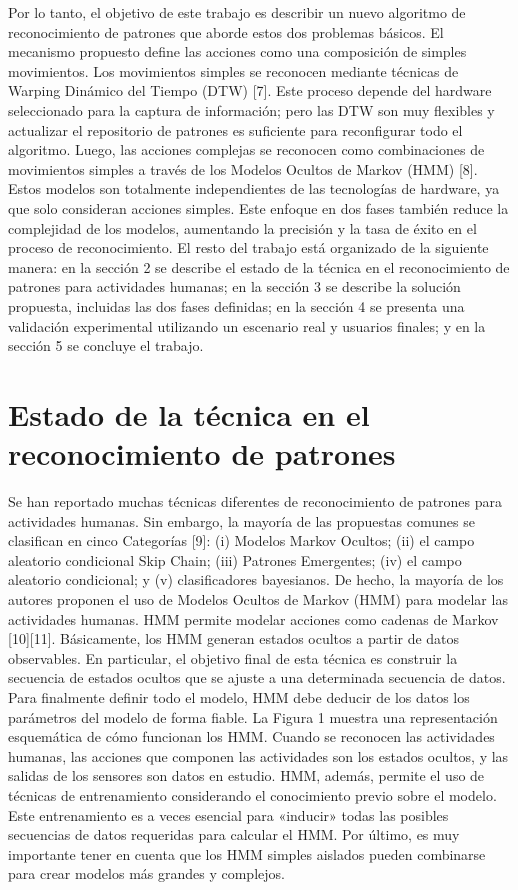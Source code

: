 \documentclass[a4paper]{article}
\begin{document}
Por lo tanto, el objetivo de este trabajo es describir un nuevo algoritmo de reconocimiento de patrones que aborde estos dos problemas básicos. El mecanismo propuesto define las acciones como una composición de simples movimientos. Los movimientos simples se reconocen mediante técnicas de Warping Dinámico del Tiempo (DTW) [7]. Este proceso depende del hardware seleccionado para la captura de información; pero las DTW son muy flexibles y actualizar el repositorio de patrones es suficiente para reconfigurar todo el algoritmo. Luego, las acciones complejas se reconocen como combinaciones de movimientos simples a través de los Modelos Ocultos de Markov (HMM) [8]. Estos modelos son totalmente independientes de las tecnologías de hardware, ya que solo consideran acciones simples. Este enfoque en dos fases también reduce la complejidad de los modelos, aumentando la precisión y la tasa de éxito en el proceso de reconocimiento.
El resto del trabajo está organizado de la siguiente manera: en la sección 2 se describe el estado de la técnica en el reconocimiento de patrones para actividades humanas; en la sección 3 se describe la solución propuesta, incluidas las dos fases definidas; en la sección 4 se presenta una validación experimental utilizando un escenario real y usuarios finales; y en la sección 5 se concluye el trabajo.

\section{Estado de la t\'ecnica en el reconocimiento de patrones}

Se han reportado muchas t\'ecnicas diferentes de reconocimiento de patrones para actividades humanas. Sin embargo, la mayoría de las propuestas comunes se clasifican en cinco
Categorías [9]: (i) Modelos Markov Ocultos; (ii) el campo aleatorio condicional Skip Chain; (iii) Patrones Emergentes; (iv) el campo aleatorio condicional; y (v) clasificadores bayesianos.
De hecho, la mayoría de los autores proponen el uso de Modelos Ocultos de Markov (HMM) para modelar las actividades humanas. HMM permite modelar acciones como cadenas de Markov [10][11]. Básicamente, los HMM generan estados ocultos a partir de datos observables. En particular, el objetivo final de esta técnica es construir la secuencia de estados ocultos que se ajuste a una determinada secuencia de datos. Para finalmente definir todo el modelo, HMM debe deducir de los datos los parámetros del modelo de forma fiable. La Figura 1 muestra una representación esquemática de cómo funcionan los HMM. Cuando se reconocen las actividades humanas, las acciones que componen las actividades son los estados ocultos, y las salidas de los sensores son datos en estudio. HMM, además, permite el uso de técnicas de entrenamiento considerando el conocimiento previo sobre el modelo. Este entrenamiento es a veces esencial para «inducir» todas las posibles secuencias de datos requeridas para calcular el HMM. Por último, es muy importante tener en cuenta que los HMM simples aislados pueden combinarse para crear modelos más grandes y complejos.
\end{document}
